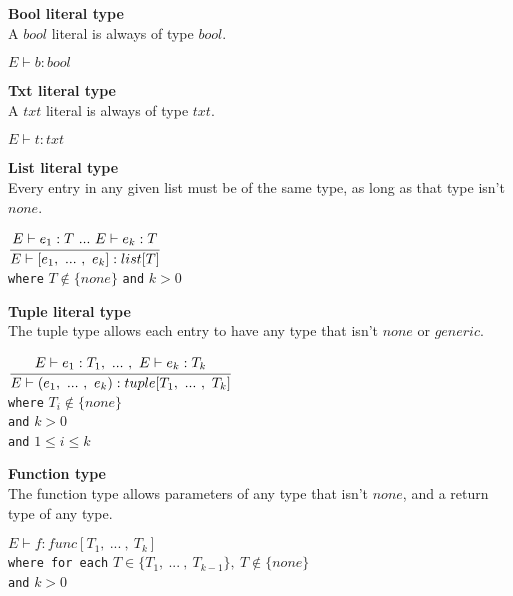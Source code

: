 \textbf{Bool literal type}\\
A $bool$ literal is always of type $bool$.

\begin{center}
	\begin{math}
	E \vdash b : bool
	\end{math}
\end{center}

\textbf{Txt literal type}\\
A $txt$ literal is always of type $txt$.

\begin{center}
	\begin{math}
	E \vdash t : txt
	\end{math}
\end{center}

\textbf{List literal type}\\
Every entry in any given list must be of the same type, as long as that type isn't $none$.

\begin{center}
	\begin{math}
	\cfrac
	{E \vdash e_1 : T\ .
		.
		.
		\ E \vdash e_k : T}
	{E \vdash [e_1,\ .
		.
		.
		\ , \ e_k] : list[T]}
	\end{math}
	\\[1\baselineskip]
	\texttt{where} $T \notin \{none\}$
	\texttt{and} $k > 0$
\end{center}

\textbf{Tuple literal type}\\
The tuple type allows each entry to have any type that isn't $none$ or $generic$.

\begin{center}
	\begin{math}
	\cfrac
	{E \vdash e_1 : T_1,\ .
	.
	.
	\ , \ E \vdash e_k : T_k}
	{E \vdash (e_1,\ .
		.
		.
		\ ,\ e_k) : tuple[T_1, \ .
		.
		.
		\ ,\ T_k]}
	\end{math}
	\\[1\baselineskip]
	\texttt{where} $T_i \notin \{none\}$\\
	\texttt{and} $k > 0$\\
	\texttt{and} $1 \le i \le k$
\end{center}

\textbf{Function type}\\
The function type allows parameters of any type that isn't $none$, and a return type of any type.

\begin{center}
	\begin{math}
	E \vdash f : func[T_1,\ .
	.
	.
	\ ,\ T_k]
	\end{math}
	\\[1\baselineskip]
	\texttt{where for each} $T \in \{T_1,\ .
	.
	.
	\ ,\ T_{k-1}\},\ T \notin \{none\}$\\
	\texttt{and} $k > 0$
\end{center}

